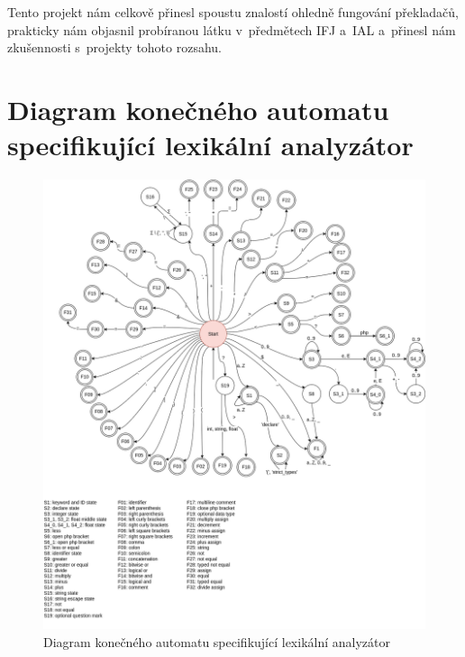 \documentclass[a4paper, 11pt]{article}
\begin{document}
	Tento projekt nám celkově přinesl spoustu znalostí ohledně fungování překladačů, prakticky nám
	objasnil probíranou látku v~předmětech IFJ a~IAL a~přinesl nám zkušennosti s~projekty tohoto rozsahu.



	\clearpage
	
	\renewcommand{\refname}{Literatura}
	



	\clearpage
	\appendix


	\section{Diagram konečného automatu specifikující lexikální analyzátor}
	\begin{figure}[!ht]
		\centering
		\includegraphics[width=0.95\linewidth]{fsm.png}
		\caption{Diagram konečného automatu specifikující lexikální analyzátor}
		\label{figure:fa_graph}
	\end{figure}

    \newpage
\end{document}
